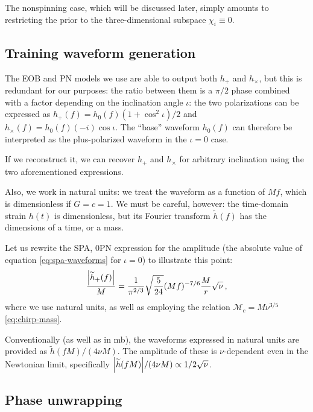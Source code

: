 \documentclass[main.tex]{subfiles}
\begin{document}
The nonspinning case, which will be discussed later, simply amounts to restricting the prior to the three-dimensional subspace \(\chi _i \equiv 0\).

\subsection{Training waveform generation}

The \ac{EOB} and \ac{PN} models we use are able to output both \(h_{+}\) and \(h_{\times }\), but this is redundant for our purposes: the ratio between them is a \(\pi /2\) phase combined with a factor depending on the inclination angle \(\iota \): the two polarizations can be expressed as \(h_{+} (f) = h_0 (f) (1 + \cos^2 \iota ) / 2\) and \(h_{\times }( f) = h_0 (f) (-i) \cos \iota \). 
The ``base'' waveform \(h_0 (f)\) can therefore be interpreted as the plus-polarized waveform in the \(\iota = 0\) case. 

If we reconstruct it, we can recover \(h_{+}\) and \(h_{\times }\) for arbitrary inclination using the two aforementioned expressions.

Also, we work in natural units: we treat the waveform as a function of \(Mf\), which is dimensionless if \(G = c = 1\).
We must be careful, however: the time-domain strain \(h(t)\) is dimensionless, but its Fourier transform \(\widetilde{h}(f)\) has the dimensions of a time, or a mass.

Let us rewrite the \ac{SPA}, 0PN expression for the amplitude (the absolute value of equation \ref{eq:spa-waveforms} for \(\iota = 0\)) to illustrate this point: 
%
\begin{align}
\frac{\abs{\widetilde{h}_+ (f)}}{M} = \frac{1}{\pi^{2/3}} \sqrt{ \frac{5}{24}}
(Mf)^{-7/6} \frac{M}{r} \sqrt{\nu }
\,,
\end{align}
%
where we use natural units, as well as employing the relation \(\mathcal{M}_c = M \nu^{3/5}\) \eqref{eq:chirp-mass}.

Conventionally (as well as in \ac{mb}), the waveforms expressed in natural units are provided as \(\widetilde{h}(fM) / (4 \nu M)\). 
The amplitude of these is  \(\nu \)-dependent even in the Newtonian limit, specifically \(\abs{\widetilde{h}(fM)} / (4 \nu M) \propto 1 / 2 \sqrt{\nu }\). 

\subsection{Phase unwrapping} \label{sec:unwrapping}
\end{document}
